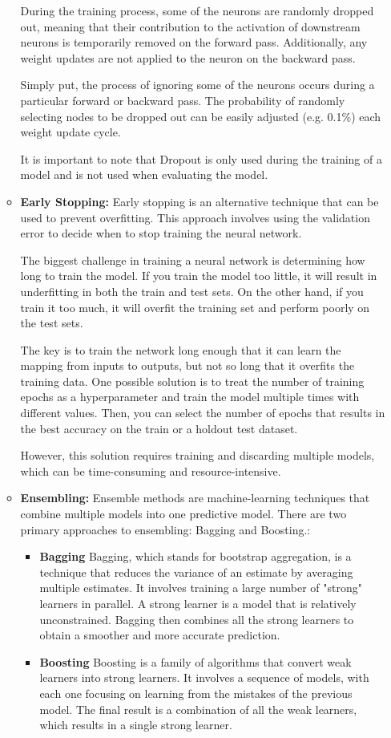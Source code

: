 \begin{itemize}
\begin{itemize}
    During the training process, some of the neurons are randomly dropped out, meaning that their contribution to the activation of downstream neurons is temporarily removed on the forward pass. Additionally, any weight updates are not applied to the neuron on the backward pass. 
    
    Simply put, the process of ignoring some of the neurons occurs during a particular forward or backward pass. The probability of randomly selecting nodes to be dropped out can be easily adjusted (e.g. 0.1\%) each weight update cycle.
    
    It is important to note that Dropout is only used during the training of a model and is not used when evaluating the model. \\
    \item \textbf{Early Stopping: } Early stopping is an alternative technique that can be used to prevent overfitting. This approach involves using the validation error to decide when to stop training the neural network.

    The biggest challenge in training a neural network is determining how long to train the model. If you train the model too little, it will result in underfitting in both the train and test sets. On the other hand, if you train it too much, it will overfit the training set and perform poorly on the test sets.
    
    The key is to train the network long enough that it can learn the mapping from inputs to outputs, but not so long that it overfits the training data. One possible solution is to treat the number of training epochs as a hyperparameter and train the model multiple times with different values. Then, you can select the number of epochs that results in the best accuracy on the train or a holdout test dataset.
    
    However, this solution requires training and discarding multiple models, which can be time-consuming and resource-intensive. \cite{goodfellow2016deep}\\
    \item \textbf{Ensembling: } Ensemble methods are machine-learning techniques that combine multiple models into one predictive model. There are two primary approaches to ensembling: Bagging and Boosting.:
    \begin{itemize}
        \item \textbf{Bagging} Bagging, which stands for bootstrap aggregation, is a technique that reduces the variance of an estimate by averaging multiple estimates. It involves training a large number of "strong" learners in parallel. A strong learner is a model that is relatively unconstrained. Bagging then combines all the strong learners to obtain a smoother and more accurate prediction.
        \item  \textbf{Boosting}
        Boosting is a family of algorithms that convert weak learners into strong learners. It involves a sequence of models, with each one focusing on learning from the mistakes of the previous model. The final result is a combination of all the weak learners, which results in a single strong learner.
        

\end{itemize}
\end{itemize}
\end{itemize}
